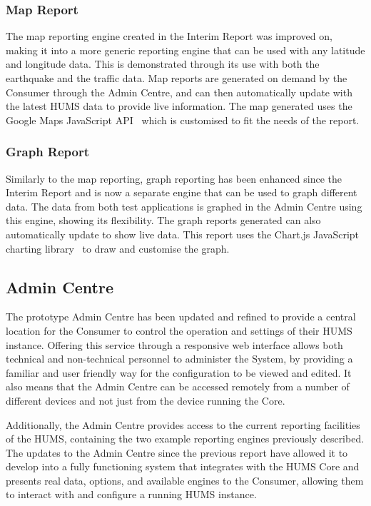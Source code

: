 \documentclass[10pt,a4paper]{article}
\begin{document}
\subsubsection{Map Report}
The map reporting engine created in the Interim Report was improved on, making it into a more generic reporting engine that can be used with any latitude and longitude data. This is demonstrated through its use with both the earthquake and the traffic data. Map reports are generated on demand by the Consumer through the Admin Centre, and can then automatically update with the latest HUMS data to provide live information. The map generated uses the Google Maps JavaScript API~\cite{g_maps} which is customised to fit the needs of the report.

\subsubsection{Graph Report}
Similarly to the map reporting, graph reporting has been enhanced since the Interim Report and is now a separate engine that can be used to graph different data. The data from both test applications is graphed in the Admin Centre using this engine, showing its flexibility. The graph reports generated can also automatically update to show live data. This report uses the Chart.js JavaScript charting library~\cite{chart_js} to draw and customise the graph.

\subsection{Admin Centre}
\label{sec:admin}

The prototype Admin Centre has been updated and refined to provide a central location for the Consumer to control the operation and settings of their HUMS instance. Offering this service through a responsive web interface allows both technical and non-technical personnel to administer the System, by providing a familiar and user friendly way for the configuration to be viewed and edited. It also means that the Admin Centre can be accessed remotely from a number of different devices and not just from the device running the Core.

Additionally, the Admin Centre provides access to the current reporting facilities of the HUMS, containing the two example reporting engines previously described. The updates to the Admin Centre since the previous report have allowed it to develop into a fully functioning system that integrates with the HUMS Core and presents real data, options, and available engines to the Consumer, allowing them to interact with and configure a running HUMS instance.
\end{document}
